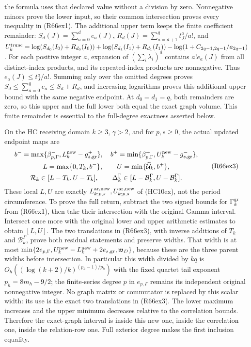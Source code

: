 the formula uses that declared value without a division by zero.
Nonnegative minors prove the lower input, so their common
intersection proves every inequality in (R66ex1).
The additional upper term keeps the finite coefficient remainder:
$S_d(J)=\sum_{a=0}^de_a(J)$,
$R_d(J)=\sum_{a=d+1}^qt_J^a/a!$, and
$U_k^{\rm trunc}=\log(S_{d_0}(I_0)+R_{d_0}(I_0))
+\log(S_{d_1}(I_1)+R_{d_1}(I_1))
-\log(1+C_{2q-1,2q-1}/a_{2q-1})$.
For each positive integer $a$, expansion of
$(\sum_i\lambda_i)^a$ contains $a!e_a(J)$ from all
distinct-index products, and its repeated-index products
are nonnegative. Thus $e_a(J)\leq t_J^a/a!$.
Summing only over the omitted degrees proves
$S_d\leq\sum_{a=0}^qe_a\leq S_d+R_d$, and increasing
logarithms proves this additional upper bound with the
same negative endpoint. At $d_0=d_1=q$, both remainders
are zero, so this upper and the full lower both equal
the exact graph volume. This finite remainder is essential
to the full-degree exactness asserted below.

On the HC receiving domain $k\geq3$, $\gamma>2$, and for
$p,s\geq0$, the actual updated endpoint maps are
\[
\begin{gathered}
 b^-=\max\{\beta_{p,\Gamma}^-,L_k^{\rm new}-g_{s,\rm gr}^+\},
 \quad b^+=\min\{\beta_{p,\Gamma}^+,U_k^{\rm new}-g_{s,\rm gr}^-\},\\
 L=\max\{0,T_k,b^-\},\qquad U=\min\{\widehat{\mathcal U}_k,b^+\},\\
 \mathcal R_k\in[L-T_k,U-T_k],\qquad
 \Delta_k^\Gamma\in[L-\mathcal B_k^\Gamma,U-\mathcal B_k^\Gamma].
\end{gathered}\tag{R66ex3}
\]
These local $L,U$ are exactly
$L_{k;p,s}^{\rm ar,new},U_{k;p,s}^{\rm ar,new}$ of (HC10ex),
not the period circumference. To prove the full return,
subtract the two signed bounds for $\Gamma_k^{\rm gr}$ from
(R66ex1), then take their intersection with the original Gamma
interval. Intersect once more with the original lower and
upper arithmetic estimates to obtain $[L,U]$.
The two translations in (R66ex3), with inverse additions
of $T_k$ and $\mathcal B_k^\Gamma$, prove both residual
statements and preserve widths. That width is at most
$\min\{2e_{p,\Gamma},U_k^{\rm new}-L_k^{\rm new}
+2e_{s,\rm gr},\mathfrak w_D\}$,
because these are the three parent widths before intersection.
In particular this width divided by $kq$ is
$O_h((\log(k+2)/k)^{(p_h-1)/p_h})$ with the fixed quartet
tail exponent $p_h=8m_h-9/2$; the finite-series degree
$p$ in $e_{p,\Gamma}$ remains its independent original
nonnegative integer.
No graph matrix or commutator is replaced by this scalar
width: its use is the exact two translations in (R66ex3).
The lower maximum increases and the upper minimum decreases
relative to the correlation bounds. Therefore the exact-graph
interval is inside this new one, inside the correlation one,
inside the relation-row one. Full exterior degree makes the
first inclusion equality.

